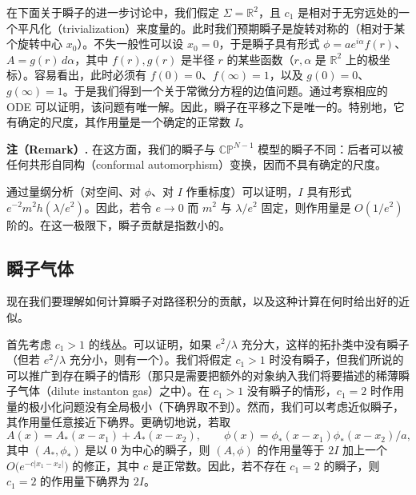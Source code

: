 在下面关于瞬子的进一步讨论中，我们假定 $\Sigma=\mathbb{R}^2$，且 $c_1$ 是相对于无穷远处的一个平凡化（trivialization）来度量的。此时我们预期瞬子是旋转对称的（相对于某个旋转中心 $x_0$）。不失一般性可以设 $x_0=0$，于是瞬子具有形式 $\phi=ae^{i\alpha}f(r)$、$A=g(r)\,d\alpha$，其中 $f(r),g(r)$ 是半径 $r$ 的某些函数（$r,\alpha$ 是 $\mathbb{R}^2$ 上的极坐标）。容易看出，此时必须有 $f(0)=0$、$f(\infty)=1$，以及 $g(0)=0$、$g(\infty)=1$。于是我们得到一个关于常微分方程的边值问题。通过考察相应的 ODE 可以证明，该问题有唯一解。因此，瞬子在平移之下是唯一的。特别地，它有确定的尺度，其作用量是一个确定的正常数 $I$。

\textbf{注（Remark）.} 在这方面，我们的瞬子与 $\mathbb{CP}^{N-1}$ 模型的瞬子不同：后者可以被任何共形自同构（conformal automorphism）变换，因而不具有确定的尺度。

通过量纲分析（对空间、对 $\phi$、对 $I$ 作重标度）可以证明，$I$ 具有形式 $e^{-2}m^2h(\lambda/e^2)$。因此，若令 $e\to0$ 而 $m^2$ 与 $\lambda/e^2$ 固定，则作用量是 $O(1/e^2)$ 阶的。在这一极限下，瞬子贡献是指数小的。



\subsection{瞬子气体}

现在我们要理解如何计算瞬子对路径积分的贡献，以及这种计算在何时给出好的近似。

首先考虑 $c_1>1$ 的线丛。可以证明，如果 $e^2/\lambda$ 充分大，这样的拓扑类中没有瞬子（但若 $e^2/\lambda$ 充分小，则有一个）。我们将假定 $c_1>1$ 时没有瞬子，但我们所说的可以推广到存在瞬子的情形（那只是需要把额外的对象纳入我们将要描述的稀薄瞬子气体（dilute instanton gas）之中）。在 $c_1>1$ 没有瞬子的情形，$c_1=2$ 时作用量的极小化问题没有全局极小（下确界取不到）。然而，我们可以考虑近似瞬子，其作用量任意接近下确界。更确切地说，若取
\[
A(x)=A_*(x-x_1)+A_*(x-x_2),\qquad \phi(x)=\phi_*(x-x_1)\phi_*(x-x_2)/a,
\]
其中 $(A_*,\phi_*)$ 是以 $0$ 为中心的瞬子，则 $(A,\phi)$ 的作用量等于 $2I$ 加上一个 $O\bigl(e^{-c|x_1-x_2|}\bigr)$ 的修正，其中 $c$ 是正常数。因此，若不存在 $c_1=2$ 的瞬子，则 $c_1=2$ 的作用量下确界为 $2I$。

